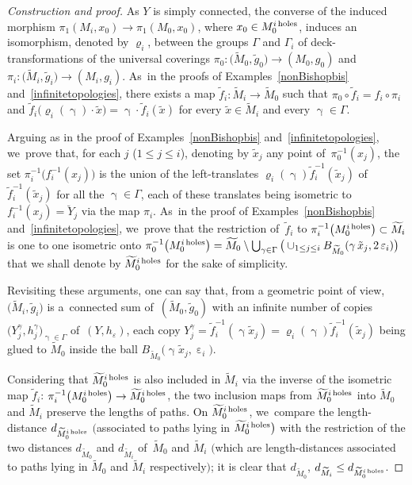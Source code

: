 \documentclass[pdftex]{sigma}
\numberwithin{equation}{section}
\newcommand{\f}{\rightarrow}
\newcommand{\g}{\operatorname{\gamma}}
\newcommand{\e}{\operatorname{\varepsilon}}
\begin{document}
\begin{proof}[Construction and proof]
As $Y$ is simply connected, the converse of the induced morphism $\pi_1 (M_i, x_0) \f \pi_1 (M_0, x_0)$, where $x_0 \in M_0^{i {\rm \, holes}}$,
induces an isomorphism, denoted by $\varrho_i $,
between the groups $\Gamma$ and $\Gamma_i$ of deck-transformations of the
universal coverings $\pi_0 \colon \big(\widetilde M_0, \tilde g_0\big)
\f (M_0, g_0)$ and $\pi_i \colon \big(\widetilde M_i, \tilde g_i\big) \f (M_i, g_i)$. As~in the proofs of Examples~\ref{nonBishopbis} and~\ref{infinitetopologies}, there exists a map $\tilde f_i \colon \widetilde M_i \f \widetilde M_0$ such
that $\pi_0 \circ \tilde f_i = f_i \circ \pi_i$ and $ \tilde f_i \big(\varrho_i (\g) \cdot \tilde x\big) = \g \cdot \tilde f_i (\tilde x)$ for every $\tilde x \in \widetilde M_i$ and every $\g \in \Gamma$.

Arguing as in the proof of Examples~\ref{nonBishopbis} and~\ref{infinitetopologies}, we~prove that, for each $j$ ($1 \le j \le i$), denoting by $\tilde x_j$ any
point of~$\pi_0^{-1} (x_j)$, the set $\pi_i^{-1} \big( f_i^{-1} (x_j)\big)$ is the union of the left-translates $ \varrho_i (\g) \tilde f_i^{-1} (
\tilde x_j) $ of~$\tilde f_i^{-1} ( \tilde x_j) $ for all the
$\g \in \Gamma$, each of these translates being isometric to $ f_i^{-1} (x_j) = \breve Y_j $ via the map $\pi_i$. As~in the proof of Examples~\ref{nonBishopbis} and~\ref{infinitetopologies}, we~prove that the restriction of~$\tilde f_i$ to
$\pi_i^{-1} \big( M_0^{i {\rm \, holes}}\big) \subset \widetilde M_i$ is one to one isometric onto $\pi_0^{-1} \big( M_0^{i {\rm \, holes}}\big) =
\widetilde M_0 \setminus \bigcup_{\g \in \Gamma} \big(\cup_{1 \le j \le i} B_{\widetilde M_0} (\g \tilde x_j, 2 \e_i)\big)$ that we shall denote by $\widetilde M_0^{i {\rm \, holes}}$ for the sake of simplicity.

Revisiting these arguments, one can say that, from a geometric point of view, $\big(\widetilde M_i, \tilde g_i\big)$ is a~connected sum of~$(\widetilde M_0, \tilde g_0)$ with an infinite
number of copies $\big(Y_j^\gamma, h_j^\gamma\big)_{\g \in \Gamma}$ of~$(Y, h_\varepsilon)$, each copy $Y_j^\gamma = \tilde f_i^{-1} (\g \tilde x_j) =
\varrho_i (\g) \tilde f_i^{-1} (\tilde x_j) $ being glued to $\widetilde M_0$ inside the ball $B_{\widetilde M_0} \big(\g \tilde x_j, \e_i \big)$.

Considering that $\widetilde M_0^{i {\rm \, holes}}$ is also included in $\widetilde M_i$ via
the inverse of the isometric map $\tilde f_i$: $ \pi_i^{-1} \big( M_0^{i {\rm \, holes}}\big) \f \widetilde M_0^{i {\rm \, holes}}$, the two inclusion maps from $\widetilde M_0^{i {\rm \, holes}}$ into $\widetilde M_0 $ and $\widetilde M_i $ preserve the lengths of paths. On
$\widetilde M_0^{i {\rm \, holes}}$, we~compare the length-distance $d_{\widetilde M_0^{i {\rm \, holes}}}$ $\big($associated to paths lying in $\widetilde M_0^{i {\rm \, holes}}\big)$ with the restriction
of the two distances $d_{\widetilde M_0 }$ and $d_{\widetilde M_i }$ of~$\widetilde M_0$ and $\widetilde M_i$ $\big($which are length-distances associated to
paths lying in $\widetilde M_0 $ and $\widetilde M_i $ respectively$\big)$; it is clear that $ d_{\widetilde M_0 }$, $d_{\widetilde M_i } \le d_{\widetilde M_0^{i {\rm \, holes}}}$.


\end{proof}
\end{document}

